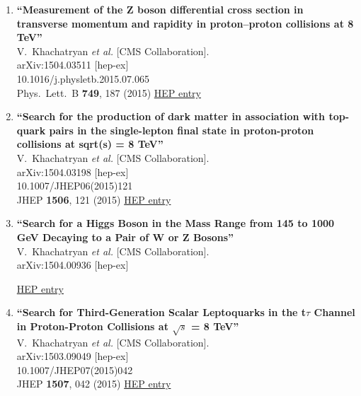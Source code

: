 \documentclass{article}
\begin{document}
\begin{enumerate}
\item%
{\bf ``Measurement of the Z boson differential cross section in transverse momentum and rapidity in proton–proton collisions at 8 TeV''}
  \\{}V.~Khachatryan {\it et al.} [CMS Collaboration].
  \\{}arXiv:1504.03511 [hep-ex]
    \\{}10.1016/j.physletb.2015.07.065
\\{}Phys.\ Lett.\ B {\bf 749}, 187 (2015) %
\href{http://inspirehep.net/record/1359450}{HEP entry}


\item%
{\bf ``Search for the production of dark matter in association with top-quark pairs in the single-lepton final state in proton-proton collisions at sqrt(s) = 8 TeV''}
  \\{}V.~Khachatryan {\it et al.} [CMS Collaboration].
  \\{}arXiv:1504.03198 [hep-ex]
    \\{}10.1007/JHEP06(2015)121
\\{}JHEP {\bf 1506}, 121 (2015) %
\href{http://inspirehep.net/record/1359293}{HEP entry}


\item%
{\bf ``Search for a Higgs Boson in the Mass Range from 145 to 1000 GeV Decaying to a Pair of W or Z Bosons''}
  \\{}V.~Khachatryan {\it et al.} [CMS Collaboration].
  \\{}arXiv:1504.00936 [hep-ex]
  
\href{http://inspirehep.net/record/1357982}{HEP entry}


\item%
{\bf ``Search for Third-Generation Scalar Leptoquarks in the t$\tau$ Channel in Proton-Proton Collisions at $\sqrt{s}$ = 8 TeV''}
  \\{}V.~Khachatryan {\it et al.} [CMS Collaboration].
  \\{}arXiv:1503.09049 [hep-ex]
    \\{}10.1007/JHEP07(2015)042
\\{}JHEP {\bf 1507}, 042 (2015) %
\href{http://inspirehep.net/record/1357201}{HEP entry}



\end{enumerate}
\end{document}

